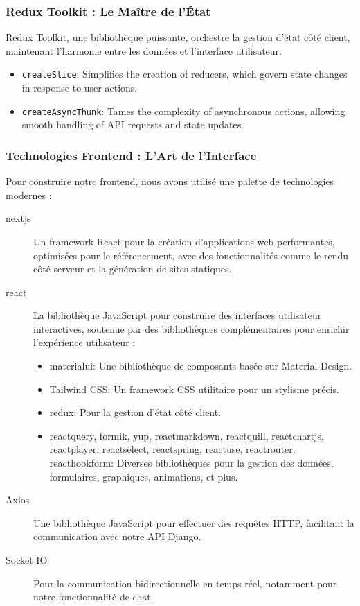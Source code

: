 \subsubsection{Redux Toolkit :  Le Maître de l'État}

Redux Toolkit, une bibliothèque puissante, orchestre la gestion d'état côté client, maintenant l'harmonie entre les données et l'interface utilisateur.

\begin{itemize}
    \item \texttt{createSlice}: Simplifies the creation of reducers, which govern state changes in response to user actions.
    \item \texttt{createAsyncThunk}: Tames the complexity of asynchronous actions, allowing smooth handling of API requests and state updates.
\end{itemize}

\subsubsection{Technologies Frontend : L'Art de l'Interface}

Pour construire notre frontend, nous avons utilisé une palette de technologies modernes :

\begin{description}
    \item[\gls{nextjs}] Un framework React pour la création d'applications web performantes, optimisées pour le référencement, avec des fonctionnalités comme le rendu côté serveur et la génération de sites statiques.
    \item[\gls{react}] La bibliothèque JavaScript pour construire des interfaces utilisateur interactives, soutenue par des bibliothèques complémentaires pour enrichir l'expérience utilisateur :
    \begin{itemize}
        \item \gls{materialui}: Une bibliothèque de composants basée sur Material Design.
        \item Tailwind CSS: Un framework CSS utilitaire pour un stylisme précis.
        \item \gls{redux}: Pour la gestion d'état côté client.
        \item \gls{reactquery}, \gls{formik}, \gls{yup}, \gls{reactmarkdown}, \gls{reactquill}, \gls{reactchartjs}, \gls{reactplayer}, \gls{reactselect}, \gls{reactspring}, \gls{reactuse}, \gls{reactrouter}, \gls{reacthookform}: Diverses bibliothèques pour la gestion des données, formulaires, graphiques, animations, et plus.
        \end{itemize}
    \item[Axios] Une bibliothèque JavaScript pour effectuer des requêtes HTTP, facilitant la communication avec notre API Django.
    \item[Socket IO] Pour la communication bidirectionnelle en temps réel, notamment pour notre fonctionnalité de chat.
\end{description}

